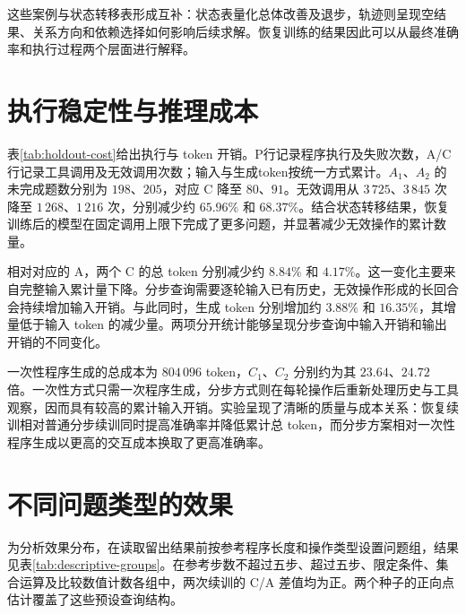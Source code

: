 这些案例与状态转移表形成互补：状态表量化总体改善及退步，轨迹则呈现空结果、关系方向和依赖选择如何影响后续求解。恢复训练的结果因此可以从最终准确率和执行过程两个层面进行解释。

\section{执行稳定性与推理成本}

\begin{table}[htbp]
  \centering
  \caption{留出集累计推理成本。P的执行计数单位为整条程序，A/C为单次工具操作。}
  \label{tab:holdout-cost}
  \resizebox{\textwidth}{!}{\PublicCostTable}
\end{table}

表\ref{tab:holdout-cost}给出执行与 token 开销。P行记录程序执行及失败次数，A/C行记录工具调用及无效调用次数；输入与生成token按统一方式累计。$A_1$、$A_2$ 的未完成题数分别为 $198$、$205$，对应 C 降至 $80$、$91$。无效调用从 $3\,725$、$3\,845$ 次降至 $1\,268$、$1\,216$ 次，分别减少约 $65.96\%$ 和 $68.37\%$。结合状态转移结果，恢复训练后的模型在固定调用上限下完成了更多问题，并显著减少无效操作的累计数量。

相对对应的 A，两个 C 的总 token 分别减少约 $8.84\%$ 和 $4.17\%$。这一变化主要来自完整输入累计量下降。分步查询需要逐轮输入已有历史，无效操作形成的长回合会持续增加输入开销。与此同时，生成 token 分别增加约 $3.88\%$ 和 $16.35\%$，其增量低于输入 token 的减少量。两项分开统计能够呈现分步查询中输入开销和输出开销的不同变化。

一次性程序生成的总成本为 $804\,096$ token，$C_1$、$C_2$ 分别约为其 $23.64$、$24.72$ 倍。一次性方式只需一次程序生成，分步方式则在每轮操作后重新处理历史与工具观察，因而具有较高的累计输入开销。实验呈现了清晰的质量与成本关系：恢复续训相对普通分步续训同时提高准确率并降低累计总 token，而分步方案相对一次性程序生成以更高的交互成本换取了更高准确率。

\section{不同问题类型的效果}

\begin{table}[htbp]
  \centering
  \caption{按参考程序划分的问题组结果。各组可以重叠。}
  \label{tab:descriptive-groups}
  \PublicGroupTable
\end{table}

为分析效果分布，在读取留出结果前按参考程序长度和操作类型设置问题组，结果见表\ref{tab:descriptive-groups}。在参考步数不超过五步、超过五步、限定条件、集合运算及比较数值计数各组中，两次续训的 C/A 差值均为正。两个种子的正向点估计覆盖了这些预设查询结构。


